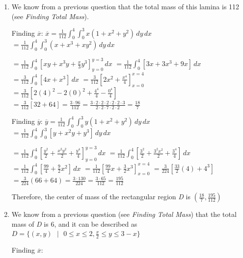 \begin{Answer}[ref = c_of_m]
\begin{enumerate}
Therefore, the center of mass is found at $\left( \overline{x}, \overline{y}
\right) = \left( \pi - \frac{4}{\pi}, \frac{\pi}{4} \right)$

\item We know from a previous question that the total mass of this lamina is 
112 (see \textit{Finding Total Mass}). 

Finding $\overline{x}$: $\overline{x} = \frac{1}{112} \int_0^4 \int_0^3 x 
\left( 1 + x^2 + y^2 \right)\,dy\,dx$ 
$= \frac{1}{112} \int_0^4 \int_0^3 \left(x + x^3 + xy^2 \right)\,dy\,dx$ 

$= \frac{1}{112} \int_0^4 \left[ xy + x^3y + \frac{x}{3}y^3 \right]_{y = 0}^{y 
= 3} \,dx$ 
$= \frac{1}{112} \int_0^4 \left[3x + 3x^3 + 9x \right]\,dx$ 
$= \frac{3}{112} \int_0^4 \left[ 4x + x^3 \right]\,dx$ 
$= \frac{3}{112} \left[ 2x^2 + \frac{x^4}{4} \right]_{x = 0}^{x = 4}$ 
$= \frac{3}{112} \left[ 2(4)^2 - 2(0)^2 + \frac{4^4}{4} - \frac{0^4}{4} 
\right]$ 
$= \frac{3}{112} \left[ 32 + 64 \right] = \frac{3 \cdot 96}{112} = \frac{3 
\cdot 2 \cdot 2 \cdot 2 \cdot 2 \cdot 2 \cdot 3}{2 \cdot 2 \cdot 7 \cdot 2 
\cdot 2} = \frac{18}{7}$

Finding $\overline{y}$: $\overline{y} = \frac{1}{112} \int_0^4 \int_0^3 y 
\left( 1 + x^2 + y^2 \right)\,dy\,dx$ 
$= \frac{1}{112} \int_0^4 \int_0^3 \left[ y + x^2y + y^3 \right]\,dy\,dx$ 

$= \frac{1}{112} \int_0^4 \left[ \frac{y^2}{2} + \frac{x^2y^2}{2} + \frac{y^4}{
4} \right]_{y = 0}^{y = 3} \,dx$ 
$= \frac{1}{112} \int_0^4 \left[ \frac{3^2}{2} + \frac{3^2x^2}{2} + \frac{3^4}{
4} \right]\,dx$ 
$= \frac{1}{112} \int_0^4 \left[ \frac{99}{4} + \frac{9}{2}x^2 \right] \,dx$ 
$= \frac{1}{112} \left[ \frac{99}{4}x + \frac{3}{2}x^3 \right]_{x = 0}^{x = 4}$ 
$= \frac{3}{224} \left[\frac{33}{2}(4) + 4^3 \right]$ 
$= \frac{3}{224} \left( 66 + 64 \right) = \frac{3 \cdot 130}{224} = \frac{3 
\cdot 65}{112} = \frac{195}{112}$

Therefore, the center of mass of the rectangular region \textit{D} is $\left(
\frac{18}{7}, \frac{195}{112} \right)$

\item We know from a previous question (see \textit{Finding Total Mass}) that 
the total mass of \textit{D} is 6, and it can be described as $\textit{D} = \{ (
x, y) \text{ }|\text{ } 0 \leq x \leq 2, \frac{x}{2} \leq y \leq 3 - x\}$

Finding $\overline{x}$:


\end{enumerate}
\end{Answer}
